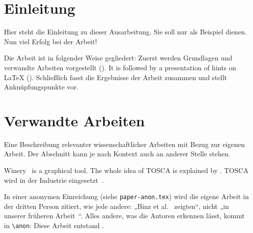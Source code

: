 \maketitle

\begin{abstract}
\lipsum[1]

\end{abstract}


\section{Einleitung}
\label{sec:introduction}
Hier steht die Einleitung zu dieser Ausarbeitung.
Sie soll nur als Beispiel dienen.
Nun viel Erfolg bei der Arbeit!

Die Arbeit ist in folgender Weise gegliedert:
Zuerst werden Grundlagen und verwandte Arbeiten vorgestellt ().
It is followed by a presentation of hints on \LaTeX{} ().
Schließlich fasst  die Ergebnisse der Arbeit zusammen und stellt Anknüpfungspunkte vor.

\section{Verwandte Arbeiten}
\label{sec:relatedwork}

Eine Beschreibung relevanter wissenschaftlicher Arbeiten mit Bezug zur eigenen Arbeit.
Der Abschnitt kann je nach Kontext auch an anderer Stelle stehen.

Winery~\citep{Winery} is a graphical  tool.
The whole idea of TOSCA is explained by \citet{Binz2009}.
TOSCA wird in der Industrie eingesetzt~.

In einer anonymen Einreichung (siehe \texttt{paper-anon.tex}) wird die eigene Arbeit in der dritten Person zitiert, wie jede andere: „Binz et al.~\cite{Binz2009} zeigten“, nicht „in unserer früheren Arbeit~\cite{Binz2009}“.
Alles andere, was die Autoren erkennen lässt, kommt in \verb+\anon+: Diese Arbeit entstand .

